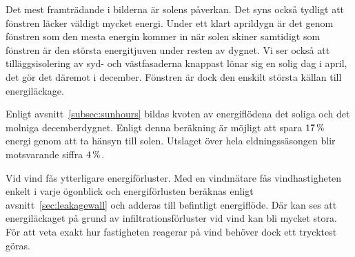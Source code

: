 Det mest framträdande i bilderna är solens påverkan. Det syns också tydligt att fönstren läcker väldigt mycket energi. Under ett klart aprildygn är det genom fönstren som den mesta energin 
kommer in när solen skiner samtidigt som fönstren är den största energitjuven under 
resten av dygnet. Vi ser också att tilläggsisolering av syd-
 och västfasaderna knappast lönar sig en solig dag i april, det gör det däremot i december. Fönstren är dock den enskilt största 
 källan till energiläckage.

Enligt avsnitt~\ref{subsec:sunhours} bildas kvoten av energiflödena det soliga och
det molniga decemberdygnet. Enligt denna beräkning är möjligt att spara $\unit[17]{\%}$ energi genom att ta hänsyn till solen. Utslaget över
hela eldningssäsongen blir motsvarande siffra $\unit[4]{\%}$.

Vid vind fås ytterligare energiförluster. Med en vindmätare fås vindhastigheten enkelt i varje ögonblick och energiförlusten beräknas enligt avsnitt~\ref{sec:leakagewall} och adderas till befintligt energiflöde. Där kan ses att energiläckaget på grund av infiltrationsförluster vid vind kan bli mycket stora. För att veta exakt hur fastigheten reagerar på vind behöver dock ett trycktest göras.
